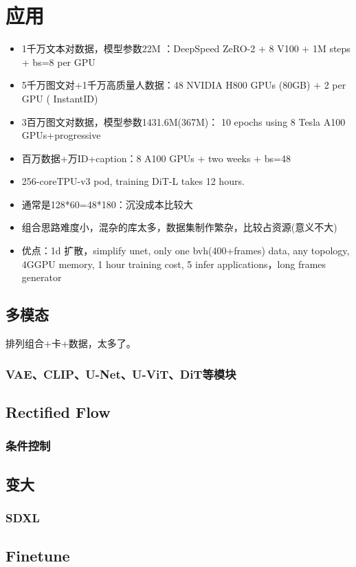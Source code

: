 \section{应用}
\begin{itemize}
    \item 1千万文本对数据，模型参数22M ：DeepSpeed ZeRO-2 +  8 V100 + 1M steps + bs=8 per GPU
    \item 5千万图文对+1千万高质量人数据：48 NVIDIA H800 GPUs (80GB) + 2 per GPU ( InstantID)
    \item 3百万图文对数据，模型参数1431.6M(367M)： 10 epochs using 8 Tesla A100 GPUs+progressive
    \item 百万数据+万ID+caption：8 A100 GPUs + two weeks + bs=48
    \item 256-coreTPU-v3 pod, training DiT-L takes 12 hours.
    \item 通常是128*60=48*180：沉没成本比较大
    \item 组合思路难度小，混杂的库太多，数据集制作繁杂，比较占资源(意义不大)
    \item 优点：1d 扩散，simplify unet, only one bvh(400+frames) data, any topology,  4GGPU memory, 1 hour training cost, 5 infer applications，long frames generator
\end{itemize}

\subsection{多模态}

排列组合+卡+数据，太多了。

\subsubsection{VAE、CLIP、U-Net、U-ViT、DiT等模块}
\subsection{Rectified Flow}
\subsubsection{条件控制}
\subsection{变大}
\subsubsection{SDXL}
\subsection{Finetune}
